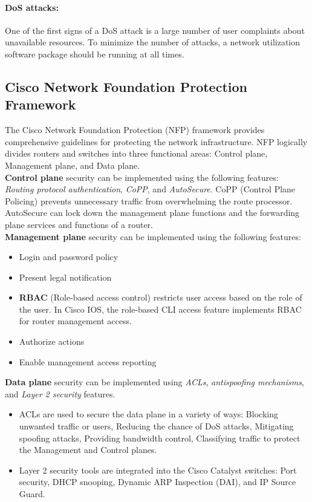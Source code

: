\paragraph{DoS attacks:} One of the first signs of a DoS attack is a large number of user complaints about unavailable resources. To minimize the number of attacks, a network utilization software package should be running at all times. 

\subsection{Cisco Network Foundation Protection Framework}

The Cisco Network Foundation Protection (NFP) framework provides comprehensive guidelines for protecting the network infrastructure.  NFP logically divides routers and switches into three functional areas: Control plane, Management plane, and Data plane.\\

\textbf{Control plane} security can be implemented using the following features: \emph{Routing protocol authentication}, \emph{CoPP}, and \emph{AutoSecure}. CoPP (Control Plane Policing) prevents unnecessary traffic from overwhelming the route processor. AutoSecure can lock down the management plane functions and the forwarding plane services and functions of a router.\\

\textbf{Management plane} security can be implemented using the following features:

\begin{itemize}
\item Login and password policy
\item Present legal notification
\item \textbf{RBAC} (Role-based access control)  restricts user access based on the role of the user. In Cisco IOS, the role-based CLI access feature implements RBAC for router management access. 
\item Authorize actions
\item Enable management access reporting
\end{itemize}

\textbf{Data plane} security can be implemented using \emph{ACLs}, \emph{antispoofing mechanisms}, and \emph{Layer 2 security} features. 

\begin{itemize}
\item ACLs are used to secure the data plane in a variety of ways: Blocking unwanted traffic or users, Reducing the chance of DoS attacks, Mitigating spoofing attacks, Providing bandwidth control, Classifying traffic to protect the Management and Control planes.
\item Layer 2 security tools are integrated into the Cisco Catalyst switches: Port security, DHCP snooping, Dynamic ARP Inspection (DAI), and IP Source Guard.
\end{itemize}